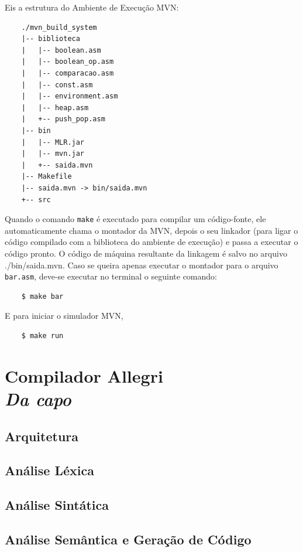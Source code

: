 \documentclass[a4paper,12pt]{report}
\begin{document}
    Eis a estrutura do Ambiente de Execução MVN:
    \begin{verbatim}
    ./mvn_build_system
    |-- biblioteca
    |   |-- boolean.asm
    |   |-- boolean_op.asm
    |   |-- comparacao.asm
    |   |-- const.asm
    |   |-- environment.asm
    |   |-- heap.asm
    |   +-- push_pop.asm
    |-- bin
    |   |-- MLR.jar
    |   |-- mvn.jar
    |   +-- saida.mvn
    |-- Makefile
    |-- saida.mvn -> bin/saida.mvn
    +-- src
    \end{verbatim}

    Quando o comando \verb|make| é executado para compilar um código-fonte, ele automaticamente chama o montador da MVN, depois o seu linkador (para ligar o código compilado com a biblioteca do ambiente de execução) e passa a executar o código pronto. O código de máquina resultante da linkagem é salvo no arquivo ./bin/saida.mvn. Caso se queira apenas executar o montador para o arquivo \verb|bar.asm|, deve-se executar no terminal o seguinte comando:

    \begin{verbatim}
    $ make bar \end{verbatim}

    E para iniciar o simulador MVN,

    \begin{verbatim}
    $ make run \end{verbatim}



    \part*{Compilador Allegri\\\textit{Da capo}}
    \chapter*{Arquitetura}
    \chapter*{Análise Léxica}
    \chapter*{Análise Sintática}
    \chapter*{Análise Semântica e Geração de Código}
\end{document}
